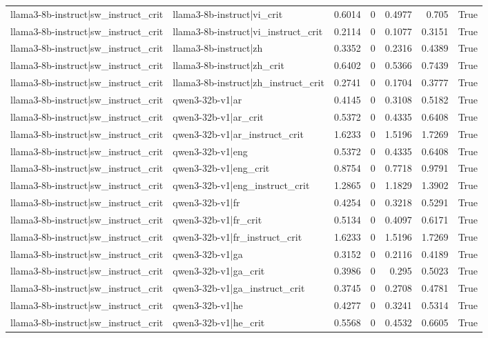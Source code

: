 \begin{table}
\begin{tabular}{l l r r r r l}
llama3-8b-instruct|sw_instruct_crit & llama3-8b-instruct|vi_crit & 0.6014 & 0 & 0.4977 & 0.705 & True \\
llama3-8b-instruct|sw_instruct_crit & llama3-8b-instruct|vi_instruct_crit & 0.2114 & 0 & 0.1077 & 0.3151 & True \\
llama3-8b-instruct|sw_instruct_crit & llama3-8b-instruct|zh & 0.3352 & 0 & 0.2316 & 0.4389 & True \\
llama3-8b-instruct|sw_instruct_crit & llama3-8b-instruct|zh_crit & 0.6402 & 0 & 0.5366 & 0.7439 & True \\
llama3-8b-instruct|sw_instruct_crit & llama3-8b-instruct|zh_instruct_crit & 0.2741 & 0 & 0.1704 & 0.3777 & True \\
llama3-8b-instruct|sw_instruct_crit & qwen3-32b-v1|ar & 0.4145 & 0 & 0.3108 & 0.5182 & True \\
llama3-8b-instruct|sw_instruct_crit & qwen3-32b-v1|ar_crit & 0.5372 & 0 & 0.4335 & 0.6408 & True \\
llama3-8b-instruct|sw_instruct_crit & qwen3-32b-v1|ar_instruct_crit & 1.6233 & 0 & 1.5196 & 1.7269 & True \\
llama3-8b-instruct|sw_instruct_crit & qwen3-32b-v1|eng & 0.5372 & 0 & 0.4335 & 0.6408 & True \\
llama3-8b-instruct|sw_instruct_crit & qwen3-32b-v1|eng_crit & 0.8754 & 0 & 0.7718 & 0.9791 & True \\
llama3-8b-instruct|sw_instruct_crit & qwen3-32b-v1|eng_instruct_crit & 1.2865 & 0 & 1.1829 & 1.3902 & True \\
llama3-8b-instruct|sw_instruct_crit & qwen3-32b-v1|fr & 0.4254 & 0 & 0.3218 & 0.5291 & True \\
llama3-8b-instruct|sw_instruct_crit & qwen3-32b-v1|fr_crit & 0.5134 & 0 & 0.4097 & 0.6171 & True \\
llama3-8b-instruct|sw_instruct_crit & qwen3-32b-v1|fr_instruct_crit & 1.6233 & 0 & 1.5196 & 1.7269 & True \\
llama3-8b-instruct|sw_instruct_crit & qwen3-32b-v1|ga & 0.3152 & 0 & 0.2116 & 0.4189 & True \\
llama3-8b-instruct|sw_instruct_crit & qwen3-32b-v1|ga_crit & 0.3986 & 0 & 0.295 & 0.5023 & True \\
llama3-8b-instruct|sw_instruct_crit & qwen3-32b-v1|ga_instruct_crit & 0.3745 & 0 & 0.2708 & 0.4781 & True \\
llama3-8b-instruct|sw_instruct_crit & qwen3-32b-v1|he & 0.4277 & 0 & 0.3241 & 0.5314 & True \\
llama3-8b-instruct|sw_instruct_crit & qwen3-32b-v1|he_crit & 0.5568 & 0 & 0.4532 & 0.6605 & True \\

\end{tabular}
\end{table}
